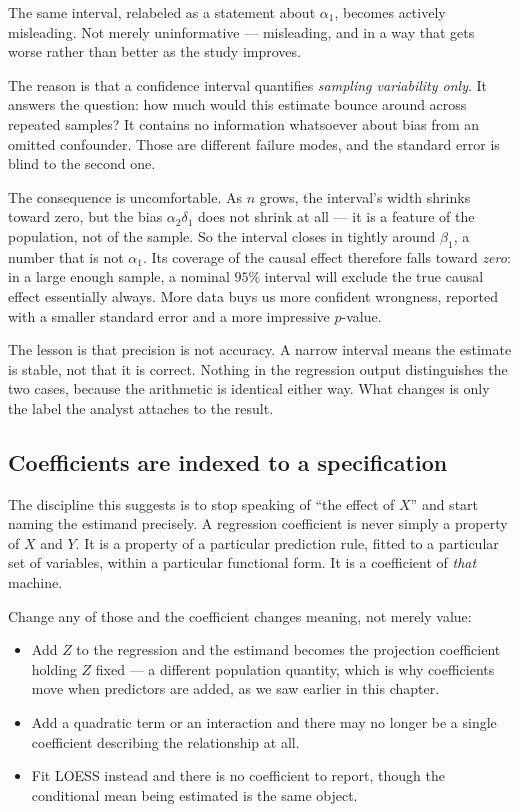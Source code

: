 \documentclass[11pt]{report}
\begin{document}
The same interval, relabeled as a statement about \(\alpha_1\), becomes actively misleading. Not merely uninformative --- misleading, and in a way that gets worse rather than better as the study improves.

The reason is that a confidence interval quantifies \emph{sampling variability only}. It answers the question: how much would this estimate bounce around across repeated samples? It contains no information whatsoever about bias from an omitted confounder. Those are different failure modes, and the standard error is blind to the second one.

The consequence is uncomfortable. As \(n\) grows, the interval's width shrinks toward zero, but the bias \(\alpha_2\delta_1\) does not shrink at all --- it is a feature of the population, not of the sample. So the interval closes in tightly around \(\beta_1\), a number that is not \(\alpha_1\). Its coverage of the causal effect therefore falls toward \emph{zero}: in a large enough sample, a nominal \(95\%\) interval will exclude the true causal effect essentially always. More data buys us more confident wrongness, reported with a smaller standard error and a more impressive \(p\)-value.

The lesson is that precision is not accuracy. A narrow interval means the estimate is stable, not that it is correct. Nothing in the regression output distinguishes the two cases, because the arithmetic is identical either way. What changes is only the label the analyst attaches to the result.

\subsection{Coefficients are indexed to a specification}

The discipline this suggests is to stop speaking of ``the effect of \(X\)'' and start naming the estimand precisely. A regression coefficient is never simply a property of \(X\) and \(Y\). It is a property of a particular prediction rule, fitted to a particular set of variables, within a particular functional form. It is a coefficient of \emph{that} machine.

Change any of those and the coefficient changes meaning, not merely value:

\begin{itemize}[leftmargin=2em]
\item Add \(Z\) to the regression and the estimand becomes the projection coefficient holding \(Z\) fixed --- a different population quantity, which is why coefficients move when predictors are added, as we saw earlier in this chapter.
\item Add a quadratic term or an interaction and there may no longer be a single coefficient describing the relationship at all.
\item Fit LOESS instead and there is no coefficient to report, though the conditional mean being estimated is the same object.
\end{itemize}
\end{document}
